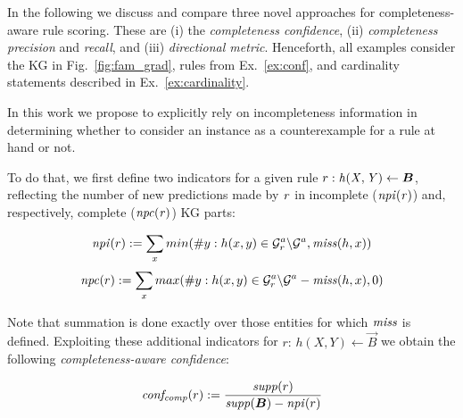 In the following we discuss and compare  
three novel approaches for completeness-aware rule scoring. These are (i) the \emph{completeness confidence}, (ii) \emph{completeness precision} and \emph{recall}, 
and (iii) \emph{directional metric}.
Henceforth, all examples 
consider the KG in Fig.~\ref{fig:fam_grad}, 
rules from Ex.~\ref{ex:conf}, and cardinality statements  described in Ex.~\ref{ex:cardinality}.

 In this work we propose to explicitly rely on incompleteness information in determining whether to consider an instance as a counterexample for a rule at hand or not.

To do that, we first define two indicators for  a given rule $r: %
\mi{h(X,Y)}\leftarrow \vec{B}$, %
reflecting the number of new 
predictions made by $\mathit{r}$ in incomplete ($\mathit{npi(r)}$) and, respectively, complete ($\mathit{npc(r)}$) KG parts:



\begin{equation}
\mathit{npi}(r) := \sum_x min(\#y: h(x,y)\in \mathcal{G}^a_r\backslash \mathcal{G}^a, \mathit{miss}(h,x))
\end{equation}
\vspace{-\topsep}
\begin{equation}
\mathit{npc}(r) := \sum_x max(\#y: h(x,y)\in\mathcal{G}^a_r\backslash \mathcal{G}^a - \mathit{miss}(h,x), 0)
\end{equation}

Note that summation is done exactly over those entities for which $\mathit{miss}$ is defined.
Exploiting these additional indicators 
for %
$r:\,h(X,Y)\leftarrow \vec{B}$ we obtain the following \emph{completeness-aware confidence}:

\begin{equation}\label{eq:comp_conf}
\mi{conf_{comp}}(r) := \frac{\mi{supp}(r)}{\mi{supp}(\vec{B}) - \mi{npi}(r)}
\end{equation}

